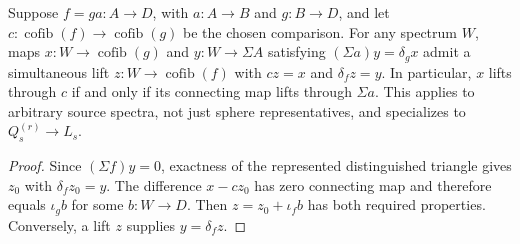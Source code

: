 \begin{proposition}
  \label{prop:h6-simultaneous-cofiber-lift}
  \leanok
  Suppose $f=ga:A\to D$, with $a:A\to B$ and $g:B\to D$,
  and let $c:\operatorname{cofib}(f)\to\operatorname{cofib}(g)$ be
  the chosen comparison. For any spectrum $W$, maps
  $x:W\to\operatorname{cofib}(g)$ and $y:W\to\Sigma A$ satisfying
  $(\Sigma a)y=\delta_gx$ admit a simultaneous lift
  $z:W\to\operatorname{cofib}(f)$ with $cz=x$ and $\delta_fz=y$.
  In particular, $x$ lifts through $c$ if and only if its connecting map
  lifts through $\Sigma a$. This applies to arbitrary source spectra,
  not just sphere representatives, and specializes to $Q_s^{(r)}\to L_s$.
\end{proposition}
\begin{proof}
  Since $(\Sigma f)y=0$, exactness of the represented distinguished
  triangle gives $z_0$ with $\delta_fz_0=y$. The difference $x-cz_0$
  has zero connecting map and therefore equals $\iota_gb$ for some
  $b:W\to D$. Then $z=z_0+\iota_fb$ has both required properties.
  Conversely, a lift $z$ supplies $y=\delta_fz$.
  \leanok
\end{proof}

